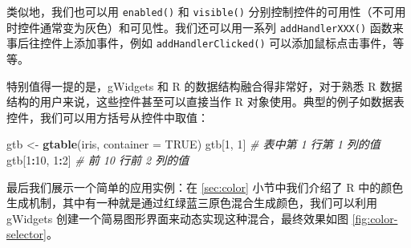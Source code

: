\documentclass[
  b5paper,
  UTF8,twoside]{book}
\newenvironment{Shaded}{\begin{snugshade}}{\end{snugshade}}
\newcommand{\AttributeTok}[1]{\textcolor[rgb]{0.13,0.29,0.53}{#1}}
\newcommand{\CommentTok}[1]{\textcolor[rgb]{0.56,0.35,0.01}{\textit{#1}}}
\newcommand{\ConstantTok}[1]{\textcolor[rgb]{0.56,0.35,0.01}{#1}}
\newcommand{\ControlFlowTok}[1]{\textcolor[rgb]{0.13,0.29,0.53}{\textbf{#1}}}
\newcommand{\DecValTok}[1]{\textcolor[rgb]{0.00,0.00,0.81}{#1}}
\newcommand{\FloatTok}[1]{\textcolor[rgb]{0.00,0.00,0.81}{#1}}
\newcommand{\FunctionTok}[1]{\textcolor[rgb]{0.13,0.29,0.53}{\textbf{#1}}}
\newcommand{\NormalTok}[1]{#1}
\newcommand{\OtherTok}[1]{\textcolor[rgb]{0.56,0.35,0.01}{#1}}
\newcommand{\SpecialCharTok}[1]{\textcolor[rgb]{0.81,0.36,0.00}{\textbf{#1}}}
\newcommand{\StringTok}[1]{\textcolor[rgb]{0.31,0.60,0.02}{#1}}
\begin{document}
类似地，我们也可以用 \texttt{enabled()} 和 \texttt{visible()} 分别控制控件的可用性（不可用时控件通常变为灰色）和可见性。我们还可以用一系列 \texttt{addHandlerXXX()} 函数来事后往控件上添加事件，例如 \texttt{addHandlerClicked()} 可以添加鼠标点击事件，等等。

特别值得一提的是，gWidgets 和 R 的数据结构融合得非常好，对于熟悉 R 数据结构的用户来说，这些控件甚至可以直接当作 R 对象使用。典型的例子如数据表控件，我们可以用方括号从控件中取值：

\begin{Shaded}
\begin{Highlighting}[]
\NormalTok{gtb }\OtherTok{\textless{}{-}} \FunctionTok{gtable}\NormalTok{(iris, }\AttributeTok{container =} \ConstantTok{TRUE}\NormalTok{)}
\NormalTok{gtb[}\DecValTok{1}\NormalTok{, }\DecValTok{1}\NormalTok{] }\CommentTok{\# 表中第 1 行第 1 列的值}
\NormalTok{gtb[}\DecValTok{1}\SpecialCharTok{:}\DecValTok{10}\NormalTok{, }\DecValTok{1}\SpecialCharTok{:}\DecValTok{2}\NormalTok{] }\CommentTok{\# 前 10 行前 2 列的值}
\end{Highlighting}
\end{Shaded}

最后我们展示一个简单的应用实例：在 \ref{sec:color} 小节中我们介绍了 R 中的颜色生成机制，其中有一种就是通过红绿蓝三原色混合生成颜色，我们可以利用 gWidgets 创建一个简易图形界面来动态实现这种混合，最终效果如图 \ref{fig:color-selector}。

\begin{Shaded}
\end{Shaded}
\end{document}
